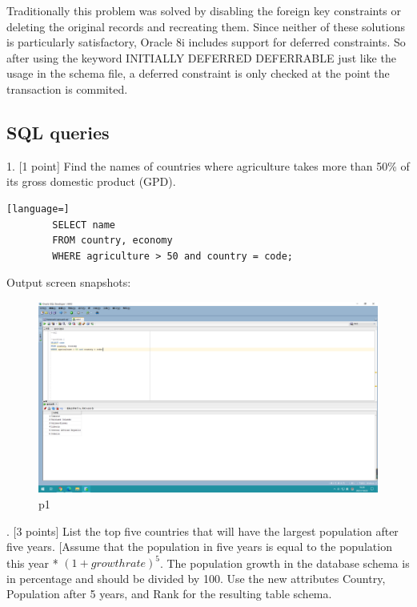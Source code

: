 \documentclass[]{article}
\begin{document}
	\noindent Traditionally this problem was solved by disabling the foreign key constraints or deleting the original records and recreating them. Since neither of these solutions is particularly satisfactory, Oracle 8i includes support for deferred constraints. So after using the keyword INITIALLY DEFERRED DEFERRABLE just like the usage in the schema file, a deferred constraint is only checked at the point the transaction is commited.  \\
	
	\clearpage
	
	\subsection{SQL queries}
	
	1. [1 point] Find the names of countries where agriculture takes more than 50\% of its gross domestic product (GPD).   \\
	
	\begin{lstlisting}[language=] 
		SELECT name
		FROM country, economy
		WHERE agriculture > 50 and country = code;
	\end{lstlisting} 
	Output screen snapshots:
	\begin{figure}[H]
		\centering
		\includegraphics[width=1\linewidth]{../screen/p1}
		\caption{p1}
		\label{fig:p1}
	\end{figure}
	
	. [3 points] List the top five countries that will have the largest population after five years. [Assume that the population in five years is equal to the population this year * $(1 + growth rate)^{5}$. The population growth in the database schema is in percentage and should be divided by 100. Use the new attributes Country, Population after 5 years, and Rank for the resulting table schema.   \\
	
\end{document}
